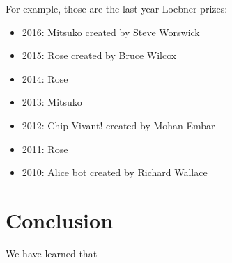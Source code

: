 \documentclass[12pt,twoside]{article}
\theoremstyle{plain}
\theoremstyle{definition}
\theoremstyle{remark}
\begin{document}
For example, those are the last year Loebner prizes:

\begin{itemize}
	\item 2016: Mitsuko created by Steve Worswick
	\item 2015: Rose created by Bruce Wilcox
	\item 2014: Rose 
	\item 2013: Mitsuko
	\item 2012: Chip Vivant! created by Mohan Embar
	\item 2011: Rose
	\item 2010: Alice bot created by Richard Wallace
\end{itemize}

\section{Conclusion}
\label{sec:conclusion}

We have learned that

%
%
\nocite{*}

\newpage


\end{document}

